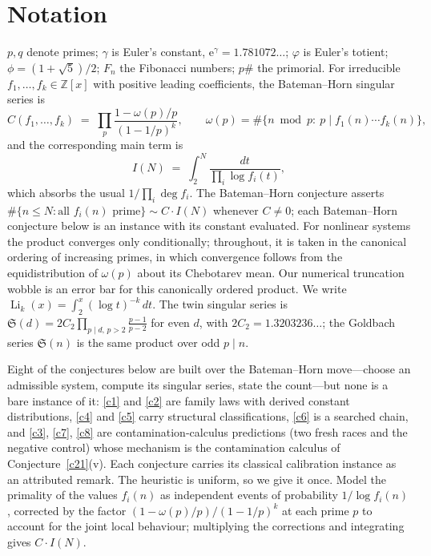 \documentclass[11pt]{article}
\theoremstyle{definition}
\newcommand{\Li}{\operatorname{Li}}
\newcommand{\e}{\mathrm{e}}
\newcommand{\SG}{\mathfrak S}
\begin{document}
\section{Notation}

$p,q$ denote primes; $\gamma$ is Euler's constant,
$\e^{\gamma}=1.781072\ldots$; $\varphi$ is Euler's totient;
$\phi=(1+\sqrt5)/2$; $F_n$ the Fibonacci numbers; $p\#$ the primorial.
For irreducible $f_1,\dots,f_k\in\mathbb Z[x]$ with positive leading
coefficients, the Bateman--Horn singular series is
\[
  C(f_1,\dots,f_k)\;=\;\prod_{p}\frac{1-\omega(p)/p}{(1-1/p)^{k}},
  \qquad
  \omega(p)=\#\{n \bmod p:\ p\mid f_1(n)\cdots f_k(n)\},
\]
and the corresponding main term is
\[
  I(N)\;=\;\int_{2}^{N}\frac{dt}{\prod_{i}\log f_i(t)},
\]
which absorbs the usual $1/\prod_i \deg f_i$.  The Bateman--Horn
conjecture \cite{BH} asserts
$\#\{n\le N: \text{all } f_i(n) \text{ prime}\}\sim C\cdot I(N)$
whenever $C\neq0$; each Bateman--Horn conjecture below is an instance
with its constant evaluated.  For nonlinear systems the product
converges only conditionally; throughout, it is taken in the canonical
ordering of increasing primes, in which convergence follows from the
equidistribution of $\omega(p)$ about its Chebotarev mean.  Our
numerical truncation wobble is an error bar for this canonically
ordered product.  We write
$\Li_k(x)=\int_2^x(\log t)^{-k}\,dt$.  The twin singular series is
$\SG(d)=2C_2\prod_{p\mid d,\,p>2}\frac{p-1}{p-2}$ for even $d$, with
$2C_2=1.3203236\ldots$; the Goldbach series $\SG(n)$ is the same product
over odd $p\mid n$.

Eight of the conjectures below are built over the Bateman--Horn
move---choose an admissible system, compute its singular series,
state the count---but none is a bare instance of it:
\ref{c1} and \ref{c2} are family laws with derived constant
distributions, \ref{c4} and \ref{c5} carry structural classifications,
\ref{c6} is a searched chain, and \ref{c3}, \ref{c7}, \ref{c8} are
contamination-calculus predictions (two fresh races and the negative
control) whose mechanism is the contamination calculus of
Conjecture~\ref{c21}(v).  Each conjecture carries
its classical calibration instance as an attributed remark.
The heuristic is uniform, so we give it once.  Model the primality of the
values $f_i(n)$ as independent events
of probability $1/\log f_i(n)$, corrected by the factor
$(1-\omega(p)/p)/(1-1/p)^k$ at each prime $p$ to account for the joint
local behaviour; multiplying the corrections and integrating gives
$C\cdot I(N)$.
\end{document}
